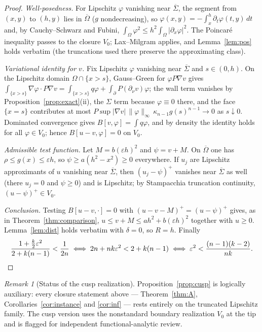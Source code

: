 \documentclass[10pt]{article}
\theoremstyle{remark}
\newtheorem{remark}[theorem]{Remark}
\newcommand{\Om}{\Omega}
\newcommand{\Sig}{\Sigma}
\newcommand{\eps}{\varepsilon}
\begin{document}
\begin{proof}
\emph{Well-posedness.} For Lipschitz $\varphi$ vanishing near $\overline\Sig$,
the segment from $(x,y)$ to $(h,y)$ lies in $\overline\Om$ ($g$ nondecreasing),
so $\varphi(x,y)=-\int_x^h\partial_t\varphi(t,y)\,dt$ and, by Cauchy--Schwarz
and Fubini, $\int_\Om\varphi^2\le h^2\int_\Om|\partial_x\varphi|^2$. The
Poincar\'e inequality passes to the closure $V_0$; Lax--Milgram applies, and
Lemma~\ref{lem:pos} holds verbatim (the truncations used there preserve the
approximating class).

\emph{Variational identity for $v$.} Fix Lipschitz $\varphi$ vanishing near
$\overline\Sig$ and $s\in(0,h)$. On the Lipschitz domain
$\Om\cap\{x>s\}$, Gauss--Green for $\varphi P\nabla v$ gives
$\int_{\{x>s\}}\nabla\varphi\cdot P\nabla v
=\int_{\{x>s\}}q\varphi+\int_{\partial}\!P(\partial_\nu v)\varphi$;
the wall term vanishes by Proposition~\ref{prop:exact}(ii), the $\Sig$ term
because $\varphi\equiv0$ there, and the face $\{x=s\}$ contributes at most
$P\sup|\nabla v|\,\|\varphi\|_\infty\,\kappa_{n-1}g(s)^{n-1}\to0$ as
$s\downarrow0$. Dominated convergence gives $B[v,\varphi]=\int q\varphi$, and by
density the identity holds for all $\varphi\in V_0$; hence $B[u-v,\varphi]=0$ on
$V_0$.

\emph{Admissible test function.} Let $M=b(\eps h)^2$ and $\psi=v+M$. On
$\overline\Om$ one has $\rho\le g(x)\le\eps h$, so
$\psi\ge a(h^2-x^2)\ge0$ everywhere. If $u_j$ are Lipschitz approximants of $u$
vanishing near $\overline\Sig$, then $(u_j-\psi)^+$ vanishes near
$\overline\Sig$ as well (there $u_j=0$ and $\psi\ge0$) and is Lipschitz; by
Stampacchia truncation continuity, $(u-\psi)^+\in V_0$.

\emph{Conclusion.} Testing $B[u-v,\cdot]=0$ with $(u-v-M)^+=(u-\psi)^+$ gives,
as in Theorem~\ref{thm:comparison}, $u\le v+M\le ah^2+b(\eps h)^2$ together
with $u\ge0$. Lemma~\ref{lem:dist} holds verbatim with $\delta=0$, so $R=h$.
Finally
\[
\frac{1+\tfrac k2\eps^2}{2+k(n-1)}<\frac1{2n}
\iff 2n+nk\eps^2<2+k(n-1)
\iff \eps^2<\frac{(n-1)(k-2)}{nk}. \qedhere
\]
\end{proof}

\begin{remark}[Status of the cusp realization]\label{rem:cuspstatus}
Proposition~\ref{prop:cusp} is logically auxiliary: every closure statement
above --- Theorem~\ref{thm:A}, Corollaries~\ref{cor:instance} and
\ref{cor:inf} --- rests entirely on the truncated Lipschitz family. The cusp
version uses the nonstandard boundary realization $V_0$ at the tip and is
flagged for independent functional-analytic review.
\end{remark}
\end{document}
